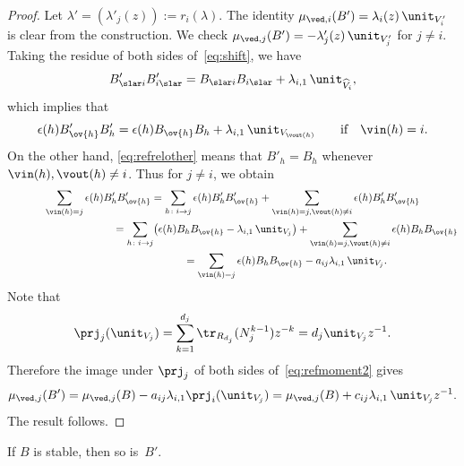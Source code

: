 \begin{proof}
Let $\lambda'=(\lambda'_j(z)) := r_i(\lambda)$.
The identity $\mu_{\ved,i}(B')=\lambda_i(z)\,\unit_{V'_i}$
is clear from the construction.
We check $\mu_{\ved,j}(B')=-\lambda'_j(z)\,\unit_{V'_j}$ for $j \neq i$.
Taking the residue of both sides of~\eqref{eq:shift}, we have
\[
 B'_{\slar i} B'_{i \slar} =  B_{\slar i} B_{i \slar}
+ \lambda_{i,1}\,\unit_{\widehat{V}_i},
\]
which implies that
\[
\epsilon(h) B'_{\ov{h}} B'_h = \epsilon(h) B_{\ov{h}} B_h
+ \lambda_{i,1}\, \unit_{V_{\vout(h)}} \qquad
\text{if} \quad \vin(h)=i.
\]
On the other hand, \eqref{eq:refrelother} means that
$B'_h = B_h$ whenever $\vin(h), \vout(h) \neq i$.
Thus for $j \neq i$, we obtain
\begin{gather}
\sum_{\vin(h)=j} \epsilon(h) B'_h B'_{\ov{h}}
 = \sum_{h \colon i \to j} \epsilon(h) B'_h B'_{\ov{h}} +
\sum_{\vin(h)=j, \vout(h) \neq i} \epsilon(h) B'_h B'_{\ov{h}} \notag\\
\hphantom{\sum_{\vin(h)=j} \epsilon(h) B'_h B'_{\ov{h}}}{}
= \sum_{h \colon i \to j}
\bigl( \epsilon(h) B_h B_{\ov{h}} - \lambda_{i,1}\,\unit_{V_j} \bigr)
+\sum_{\vin(h)=j, \vout(h) \neq i} \epsilon(h) B_h B_{\ov{h}} \notag\\
\hphantom{\sum_{\vin(h)=j} \epsilon(h) B'_h B'_{\ov{h}}}{}
=\sum_{\vin(h)=j} \epsilon(h) B_h B_{\ov{h}}
- a_{ij}\lambda_{i,1}\,\unit_{V_j}.\label{eq:refmoment2}
\end{gather}
Note that
\[
\prj_j(\unit_{V_j}) = \sum_{k=1}^{d_j} \tr_{R_{d_j}} (N_j^{k-1}) z^{-k}
= d_j \unit_{V_j} z^{-1}.
\]
Therefore the image under $\prj_j$
of both sides of~\eqref{eq:refmoment2} gives
\[
\mu_{\ved,j}(B') = \mu_{\ved,j}(B)
- a_{ij}\lambda_{i,1} \prj_i(\unit_{V_j})
=\mu_{\ved,j}(B)
+ c_{ij}\lambda_{i,1}\,\unit_{V_j}z^{-1}.
\]
The result follows.
\end{proof}

\begin{Lemma}\label{lem:refirred}
If $B$ is stable, then so is~$B'$.
\end{Lemma}

